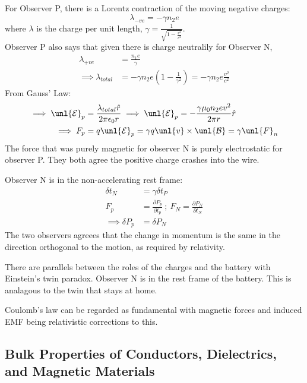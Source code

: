 \documentclass[a4paper, 11pt, normalem]{report}
\newcommand\p{\partial}
\newcommand\E{\mathcal{E}}
\newcommand\uE{\unl{\E}}
\newcommand\B{\mathcal{B}}
\newcommand\uB{\unl{\B}}
\newcommand\eno{\epsilon_0}
\newcommand\hr{\hat{r}}
\newcommand\lam{\lambda}
\begin{document}
\chapter{}
For Observer P, there is a Lorentz contraction of the moving negative charges:
\begin{equation*}
    \lam_{-ve} = -\gamma n_2e
\end{equation*}
where $\lam$ is the charge per unit length, $\gamma = \frac{1}{\sqrt{1 - \tfrac{v^2}{c^2}}}$. \\
Observer P also says that given there is charge neutralily for Observer N,
\begin{align*}
    \lam_{+ve} &= \frac{n_1 e}{\gamma} \\
    \implies \lam_{total} &= -\gamma n_2e \left(1 - \frac{1}{\gamma^2}\right) = -\gamma n_2e\frac{v^2}{c^2}
\end{align*}
From Gauss' Law:
\begin{align*}
    \implies \uE_p &= \frac{\lam_{total}\hr}{2\pi\eno r} \implies \uE_p = -\frac{\gamma \mu_0n_2ev^2}{2\pi r}\hr \\
    \implies F_p &= q\uE_p = \gamma q\unl{v} \times \uB = \gamma \unl{F}_n
\end{align*}
The force that was purely magnetic for observer N is purely electrostatic for observer P.
They both agree the positive charge crashes into the wire.

Observer N is in the non-accelerating rest frame:
\begin{align*}
    \delta t_N &= \gamma \delta t_P \\
    F_p &= \frac{\p P_p}{\p t_p} ~;~ F_N = \frac{\p P_N}{\p t_N} \\
    \implies \delta P_p &= \delta P_N
\end{align*}
The two observers agreees that the change in momentum is the same in the direction orthogonal to the motion, as required by relativity.

There are parallels between the roles of the charges and the battery with Einstein's twin paradox.
Observer N is in the rest frame of the battery.
This is analagous to the twin that stays at home.

Coulomb's law can be regarded as fundamental with magnetic forces and induced EMF being relativistic corrections to this.

\section{Bulk Properties of Conductors, Dielectrics, and Magnetic Materials}
\end{document}
